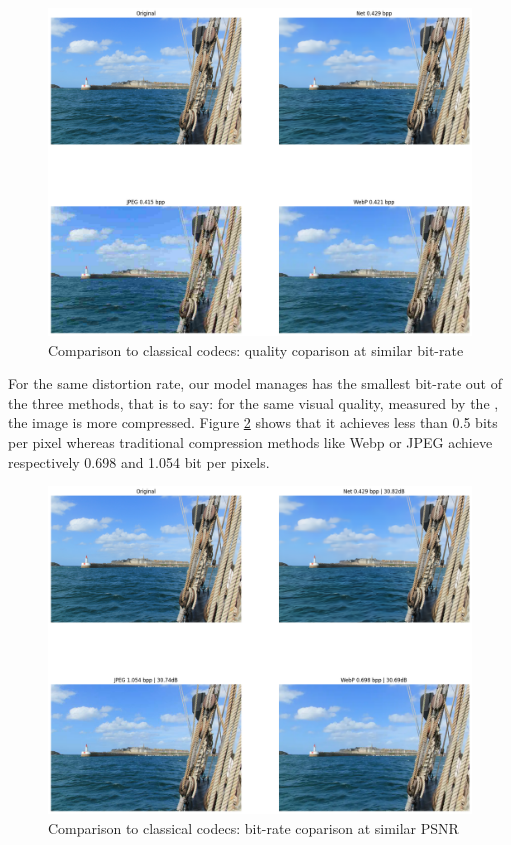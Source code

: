\begin{figure}
    \centering
    \includegraphics[width=15cm]{img/balle_repro_2.png}
    \caption{Comparison to classical codecs: quality coparison at similar bit-rate}
    \label{balle_repro_2}
\end{figure}

For the same distortion rate, our model manages has the smallest bit-rate out of the three methods, that is to say: for the same visual quality, measured by the , the image is more compressed. Figure \ref{balle_repro_3} shows that it achieves less than 0.5 bits per pixel whereas traditional compression methods like Webp or JPEG achieve respectively 0.698 and 1.054 bit per pixels.

\begin{figure}
    \centering
    \includegraphics[width=15cm]{img/balle_repro_3.png}
    \caption{Comparison to classical codecs: bit-rate coparison at similar PSNR}
    \label{balle_repro_3}
\end{figure}

